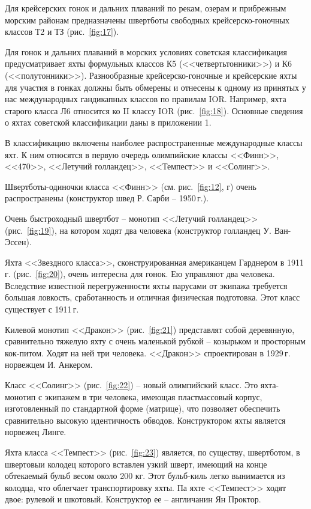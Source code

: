 \documentclass[a4paper, 12pt, twoside, final]{scrbook}
\begin{document}
Для крейсерских гонок и дальних плаваний по рекам, озерам и прибрежным
морским районам предназначены швертботы свободных крейсерско-гоночных
классов Т2 и ТЗ (рис.~\ref{fig:17}).

Для гонок и дальних плаваний в морских условиях советская классификация
предусматривает яхты формульных классов К5 (<<четвертьтонники>>)
и К6 (<<полутонники>>). Разнообразные крейсерско-гоночные и крейсерские
яхты для участия в гонках должны быть обмерены и отнесены к одному
из принятых у нас международных гандикапных классов по правилам IOR.
Например, яхта старого класса Л6 относится ко II классу IOR (рис.~\ref{fig:18}).
Основные сведения о яхтах советской классификации даны в приложении
1.

В классификацию включены наиболее распространенные международные классы
яхт. К ним относятся в первую очередь олимпийские классы <<Финн>>,
<<470>>, <<Летучий голландец>>, <<Темпест>> и <<Солинг>>.

Швертботы-одиночки класса <<Финн>> (см. рис.~\ref{fig:12},
г) очень распространены (конструктор швед Р. Сарби \--- 1950\,г.).

Очень быстроходный швертбот \--- монотип <<Летучий голландец>> (рис.~\ref{fig:19}),
на котором ходят два человека (конструктор голландец У. Ван-Эссен).

Яхта <<Звездного класса>>, сконструированная американцем Гарднером в 1911\,г. (рис.~\ref{fig:20}), очень интересна для гонок. Ею управляют два человека. Вследствие известной перегруженности яхты парусами от экипажа требуется большая ловкость, сработанность и отличная физическая подготовка. Этот класс существует с 1911\,г.

Килевой монотип <<Дракон>> (рис.~\ref{fig:21})
представлят собой деревянную, сравнительно тяжелую яхту с очень маленькой
рубкой \--- козырьком и просторным кок-питом. Ходят на ней три человека.
<<Дракон>> спроектирован в 1929\,г. норвежцем И. Анкером.

Класс <<Солинг>> (рис.~\ref{fig:22}) \--- новый олимпийский класс. Это яхта-монотип с экипажем в три человека,
имеющая пластмассовый корпус, изготовленный по стандартной форме (матрице),
что позволяет обеспечить сравнительно высокую идентичность обводов.
Конструктором яхты является норвежец Линге.

Яхта класса <<Темпест>> (рис.~\ref{fig:23})
является, по существу, швертботом, в швертовыи колодец которого вставлен
узкий шверт, имеющий на конце обтекаемый бульб весом около 200 кг.
Этот бульб-киль легко вынимается из колодца, что облегчает транспортировку
яхты. Па яхте <<Темпест>> ходят двое: рулевой и шкотовый. Конструктор
ее \--- англичанин Ян Проктор.
\end{document}
